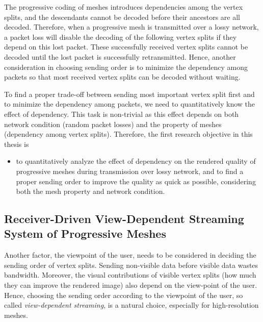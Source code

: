 \documentclass[11pt, a4paper]{report}
\begin{document}
    The progressive coding of meshes introduces dependencies among 
    the vertex splits, and the descendants cannot be decoded
    before their ancestors are all decoded. Therefore, 
    when a progressive mesh is transmitted over a lossy network,
    a packet loss will disable the decoding of the following
    vertex splits if they depend on this lost packet. 
    These successfully received vertex splits cannot be 
    decoded until the lost packet is successfully retransmitted. 
    Hence, another consideration in choosing sending order
    is to minimize the dependency among packets so that most
    received vertex splits can be decoded without waiting.
    
    To find a proper trade-off between sending most important vertex
    split first and to minimize the dependency among packets, we 
    need to quantitatively know the effect of dependency. This task
    is non-trivial as this effect depends on both network condition (random
    packet losses) and the property of meshes (dependency among vertex splits).
    Therefore, the first research objective in this thesis is
    \begin{itemize}
        \item
            to quantitatively analyze the effect of dependency on 
            the rendered quality of progressive meshes 
            during transmission over lossy network, and to find
            a proper sending order to improve the quality as quick
            as possible, considering both the mesh property and network condition. 
    \end{itemize}
    
    \subsection{Receiver-Driven View-Dependent Streaming System of Progressive Meshes}
    Another factor, the viewpoint of the user, 
    needs to be considered in deciding the sending order of vertex splits.
    Sending non-visible data before visible data wastes bandwidth. 
    Moreover, the visual contributions of visible
    vertex splits (how much they can improve the rendered image)
    also depend on the view-point of the user.
    Hence, choosing the sending order according to the viewpoint of the user, 
    so called \emph{view-dependent streaming}, is a natural choice, especially
    for high-resolution meshes.
    
\end{document}
